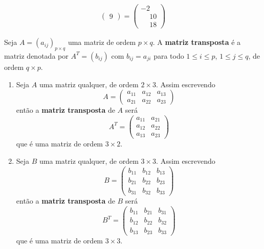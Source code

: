 \begin{observacao}
\begin{align*}
\begin{pmatrix}
        9\end{pmatrix} = \begin{pmatrix}-2\\\phantom{-}10\\\phantom{-}18\end{pmatrix}
    \end{align*}
\end{observacao}

\begin{definicao}
    Seja $A = (a_{ij})_{p\times q}$ uma matriz de ordem $p\times q$. A \textbf{matriz transposta} é a matriz
    denotada por $A^T = (b_{ij})$ com $b_{ij} = a_{ji}$ para todo $1 \le i \le p$, $1 \le j \le q$, de ordem $q \times p$.
\end{definicao}

\begin{exemplos}
    \begin{enumerate}[label={\arabic*})]
        \item Seja $A$ uma matriz qualquer, de ordem $2 \times 3$.
            Assim escrevendo
            \[
                A = \begin{pmatrix}
                        a_{11} & a_{12} & a_{13}\\
                        a_{21} & a_{22} & a_{23}
                    \end{pmatrix}
            \]
            então a \textbf{matriz transposta} de $A$ será
            \[
                A^T = \begin{pmatrix}
                        a_{11} & a_{21}\\
                        a_{12} & a_{22}\\
                        a_{13} & a_{23}
                    \end{pmatrix}
            \]
            que é uma matriz de ordem $3 \times 2$.

        \item Seja $B$ uma matriz qualquer, de ordem $3 \times 3$.
            Assim escrevendo
            \[
                B = \begin{pmatrix}
                        b_{11} & b_{12} & b_{13}\\
                        b_{21} & b_{22} & b_{23}\\
                        b_{31} & b_{32} & b_{33}
                    \end{pmatrix}
            \]
            então a \textbf{matriz transposta} de $B$ será
            \[
                B^T = \begin{pmatrix}
                        b_{11} & b_{21} & b_{31}\\
                        b_{12} & b_{22} & b_{32}\\
                        b_{13} & b_{23} & b_{33}
                    \end{pmatrix}
            \]
            que é uma matriz de ordem $3 \times 3$.


\end{enumerate}
\end{exemplos}
